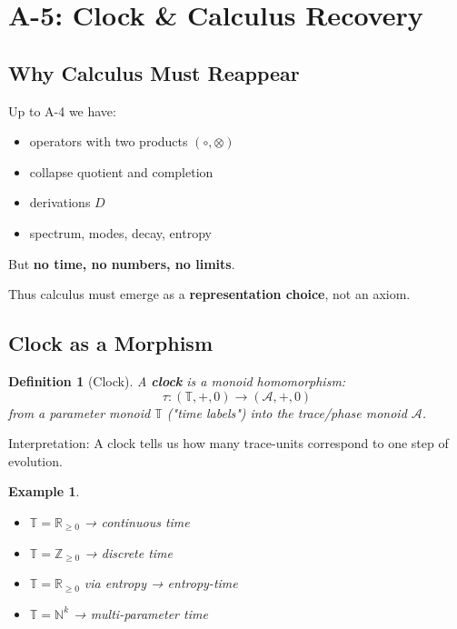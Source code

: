 \documentclass[12pt, oneside]{article}
\newtheorem{definition}[theorem]{Definition}
\newtheorem{example}[theorem]{Example}
\newcommand{\A}{\mathcal{A}}
\begin{document}
\section{A-5: Clock \& Calculus Recovery}

\subsection{Why Calculus Must Reappear}

Up to A-4 we have:
\begin{itemize}
    \item operators with two products $(\circ, \otimes)$
    \item collapse quotient and completion
    \item derivations $D$
    \item spectrum, modes, decay, entropy
\end{itemize}
But \textbf{no time, no numbers, no limits}.

Thus calculus must emerge as a \textbf{representation choice}, not an axiom.

\subsection{Clock as a Morphism}

\begin{definition}[Clock]
A \textbf{clock} is a monoid homomorphism:
\begin{equation}
\tau: (\mathbb{T}, +, 0) \rightarrow (\A, +, 0)
\end{equation}
from a parameter monoid $\mathbb{T}$ ("time labels") into the trace/phase monoid $\A$.
\end{definition}

Interpretation: A clock tells us how many trace-units correspond to one step of evolution.

\begin{example}
\begin{itemize}
    \item $\mathbb{T} = \mathbb{R}_{\geq 0}$ → continuous time
    \item $\mathbb{T} = \mathbb{Z}_{\geq 0}$ → discrete time
    \item $\mathbb{T} = \mathbb{R}_{\geq 0}$ via entropy → entropy-time
    \item $\mathbb{T} = \mathbb{N}^k$ → multi-parameter time
\end{itemize}
\end{example}
\end{document}
